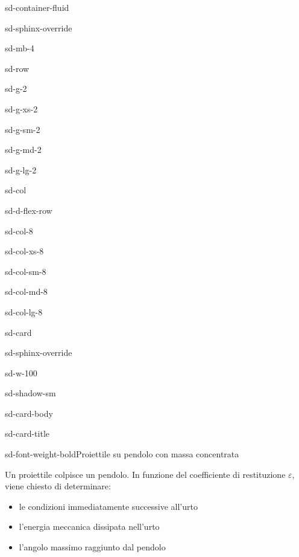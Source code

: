 \documentclass[letterpaper,10pt,italian]{jupyterBook}
\begin{document}
\begin{sphinxuseclass}{sd-container-fluid}
\begin{sphinxuseclass}{sd-sphinx-override}
\begin{sphinxuseclass}{sd-mb-4}
\begin{sphinxuseclass}{sd-row}
\begin{sphinxuseclass}{sd-g-2}
\begin{sphinxuseclass}{sd-g-xs-2}
\begin{sphinxuseclass}{sd-g-sm-2}
\begin{sphinxuseclass}{sd-g-md-2}
\begin{sphinxuseclass}{sd-g-lg-2}
\begin{sphinxuseclass}{sd-col}
\begin{sphinxuseclass}{sd-d-flex-row}
\begin{sphinxuseclass}{sd-col-8}
\begin{sphinxuseclass}{sd-col-xs-8}
\begin{sphinxuseclass}{sd-col-sm-8}
\begin{sphinxuseclass}{sd-col-md-8}
\begin{sphinxuseclass}{sd-col-lg-8}
\begin{sphinxuseclass}{sd-card}
\begin{sphinxuseclass}{sd-sphinx-override}
\begin{sphinxuseclass}{sd-w-100}
\begin{sphinxuseclass}{sd-shadow-sm}
\begin{sphinxuseclass}{sd-card-body}
\begin{sphinxuseclass}{sd-card-title}
\begin{sphinxuseclass}{sd-font-weight-bold}Proiettile su pendolo con massa concentrata
\end{sphinxuseclass}
\end{sphinxuseclass}
\sphinxAtStartPar
Un proiettile colpisce un pendolo. In funzione del coefficiente di restituzione \(\varepsilon\), viene chiesto di determinare:
\begin{itemize}
\item {} 
\sphinxAtStartPar
le condizioni immediatamente successive all’urto

\item {} 
\sphinxAtStartPar
l’energia meccanica dissipata nell’urto

\item {} 
\sphinxAtStartPar
l’angolo massimo raggiunto dal pendolo

\end{itemize}


\end{sphinxuseclass}
\end{sphinxuseclass}
\end{sphinxuseclass}
\end{sphinxuseclass}
\end{sphinxuseclass}
\end{sphinxuseclass}
\end{sphinxuseclass}
\end{sphinxuseclass}
\end{sphinxuseclass}
\end{sphinxuseclass}
\end{sphinxuseclass}
\end{sphinxuseclass}
\end{sphinxuseclass}
\end{sphinxuseclass}
\end{sphinxuseclass}
\end{sphinxuseclass}
\end{sphinxuseclass}
\end{sphinxuseclass}
\end{sphinxuseclass}
\end{sphinxuseclass}
\end{sphinxuseclass}
\end{document}
